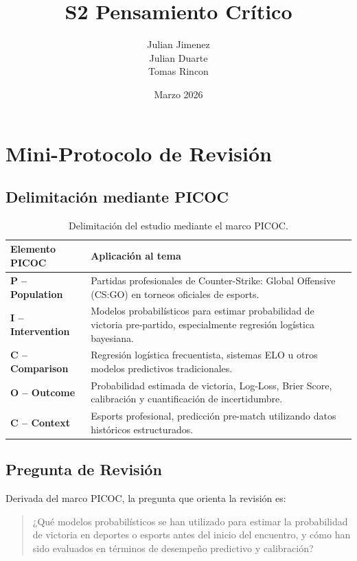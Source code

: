 \documentclass{article}
\title{S2 Pensamiento Crítico}
\author{Julian Jimenez \\ Julian Duarte \\ Tomas Rincon}
\date{Marzo 2026}
\begin{document}
\maketitle

\section{Mini-Protocolo de Revisión}

\subsection{Delimitación mediante PICOC}

\begin{table}[H]
\centering
\begin{tabular}{|l|p{9cm}|}
\hline
\textbf{Elemento PICOC} & \textbf{Aplicación al tema} \\
\hline
\textbf{P – Population} & Partidas profesionales de Counter-Strike: Global Offensive (CS:GO) en torneos oficiales de esports. \\
\hline
\textbf{I – Intervention} & Modelos probabilísticos para estimar probabilidad de victoria pre-partido, especialmente regresión logística bayesiana. \\
\hline
\textbf{C – Comparison} & Regresión logística frecuentista, sistemas ELO u otros modelos predictivos tradicionales. \\
\hline
\textbf{O – Outcome} & Probabilidad estimada de victoria, Log-Loss, Brier Score, calibración y cuantificación de incertidumbre. \\
\hline
\textbf{C – Context} & Esports profesional, predicción pre-match utilizando datos históricos estructurados. \\
\hline
\end{tabular}
\caption{Delimitación del estudio mediante el marco PICOC.}
\label{tab:picoc}
\end{table}

\subsection{Pregunta de Revisión}

Derivada del marco PICOC, la pregunta que orienta la revisión es:

\begin{quote}
¿Qué modelos probabilísticos se han utilizado para estimar la probabilidad de victoria en deportes o esports antes del inicio del encuentro, y cómo han sido evaluados en términos de desempeño predictivo y calibración?
\end{quote}
\end{document}
